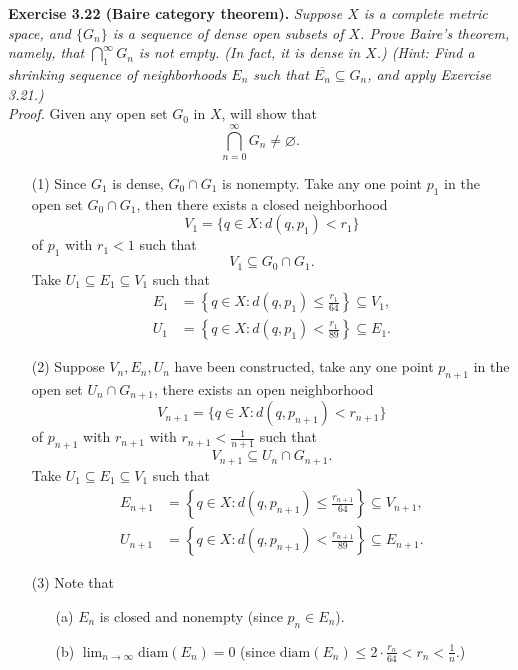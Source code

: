 \documentclass{article}
\begin{document}



\textbf{Exercise 3.22 (Baire category theorem).}
\emph{Suppose $X$ is a complete metric space,
and $\{G_n\}$ is a sequence of dense open subsets of $X$.
Prove Baire's theorem, namely, that $\bigcap^\infty_1{G_n}$ is not empty.
(In fact, it is dense in $X$.)
(Hint: Find a shrinking sequence of neighborhoods $E_n$ such
that $\overline{E_n} \subseteq G_n$, and apply Exercise 3.21.) } \\

\emph{Proof.}
Given any open set $G_0$ in $X$,
will show that $$\bigcap_{n=0}^{\infty} G_n \neq \varnothing.$$
\begin{enumerate}
\item[(1)]
Since $G_1$ is dense, $G_0 \cap G_1$ is nonempty.
Take any one point $p_1$ in the open set $G_0 \cap G_1$,
then there exists a closed neighborhood
$$V_1
= \{ q \in X : d(q,p_1) < r_1 \}$$
of $p_1$ with $r_1 < 1$
such that
$$V_1 \subseteq G_0 \cap G_1.$$
Take $U_1 \subseteq E_1 \subseteq V_1$
such that
\begin{align*}
E_1 &= \left\{ q \in X : d(q,p_1) \leq \frac{r_1}{64} \right\} \subseteq V_1, \\
U_1 &= \left\{ q \in X : d(q,p_1) < \frac{r_1}{89} \right\} \subseteq E_1.
\end{align*}
\item[(2)]
Suppose $V_n, E_n, U_n$ have been constructed,
take any one point $p_{n+1}$ in the open set $U_n \cap G_{n+1}$,
there exists an open neighborhood
$$V_{n+1}
= \{ q \in X : d(q,p_{n+1}) < r_{n+1} \}$$
of $p_{n+1}$ with $r_{n+1}$ with $r_{n+1} < \frac{1}{n+1}$
such that
$$V_{n+1} \subseteq U_n \cap G_{n+1}.$$
Take $U_1 \subseteq E_1 \subseteq V_1$
such that
\begin{align*}
E_{n+1} &= \left\{ q \in X : d(q,p_{n+1}) \leq \frac{r_{n+1}}{64} \right\} \subseteq V_{n+1}, \\
U_{n+1} &= \left\{ q \in X : d(q,p_{n+1}) < \frac{r_{n+1}}{89} \right\} \subseteq E_{n+1}.
\end{align*}
\item[(3)]
Note that
  \begin{enumerate}
  \item[(a)]
  $E_n$ is closed and nonempty (since $p_n \in E_n$).
  \item[(b)]
  $\lim_{n \to \infty} \mathrm{diam}(E_n) = 0$
  (since $\mathrm{diam}(E_n) \leq 2 \cdot \frac{r_n}{64} < r_n < \frac{1}{n}$.)

\end{enumerate}
\end{enumerate}
\end{document}
